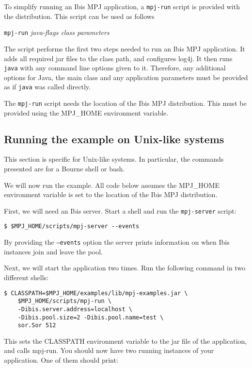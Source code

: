 \documentclass[a4paper,10pt]{article}
\begin{document}
To simplify running an Ibis MPJ application, a \texttt{mpj-run} script is
provided with the distribution. This script can be
used as follows

\begin{center}
\texttt{mpj-run} \emph{java-flags class parameters}
\end{center}

The script performs the first two steps needed to run an Ibis MPJ application.
It adds all required jar files
to the class path, and configures log4j.
It then runs \texttt{java} with any
command line options given to it. Therefore, any additional options for
Java, the main class and any application parameters must be provided as
if \texttt{java} was called directly.

The \texttt{mpj-run} script needs the location of the Ibis MPJ
distribution. This must be provided using the MPJ\_HOME environment
variable.

\subsection{Running the example on Unix-like systems}

This section is specific for Unix-like systems. In particular, the
commands presented are for a Bourne shell or bash.

We will now run the example. All code below assumes the MPJ\_HOME
environment variable is set to the location of the Ibis MPJ distribution.

First, we will need an Ibis server. Start a shell and
run the \texttt{mpj-server} script:
\noindent
{\small
\begin{verbatim}
$ $MPJ_HOME/scripts/mpj-server --events
\end{verbatim}
}
\noindent

By providing the \texttt{--events} option the server
prints information on when Ibis instances join and leave the pool.

Next, we will start the application two times.
Run the following command in two different shells:

\noindent
{\small
\begin{verbatim}
$ CLASSPATH=$MPJ_HOME/examples/lib/mpj-examples.jar \
    $MPJ_HOME/scripts/mpj-run \
    -Dibis.server.address=localhost \
    -Dibis.pool.size=2 -Dibis.pool.name=test \
    sor.Sor 512
\end{verbatim}
}
\noindent

This sets the CLASSPATH environment variable to the jar file of the
application, and calls mpj-run. You should now have two running
instances of your application. One of them should print:
\end{document}
